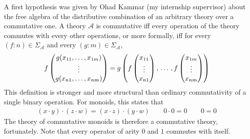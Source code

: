 

A first hypothesis was given by Ohad Kammar (my internship supervisor) about the free algebra of the distributive combination of an arbitrary theory over a commutative one. A theory $\mathcal A$ is commutative iff every operation of the theory commutes with every other operations, or more formally, iff for every $(f : n) \in \Sigma_\mathcal{A}$ and every $(g : m) \in \Sigma_\mathcal{A}$,
\begin{equation}
f \begin{pmatrix}
  g(x_{11}, \dots, x_{1m})\\
  \vdots\\
  g(x_{n1}, \dots, x_{nm})
\end{pmatrix} = g \left(
  f \begin{pmatrix}
    x_{11}\\
    \vdots\\
    x_{n1}
  \end{pmatrix},\, \dots\,, f \begin{pmatrix}
    x_{1m}\\
    \vdots\\
    x_{nm}
  \end{pmatrix}
\right)
  \label{eq:commutativity_theory}
\end{equation}
This definition is stronger and more structural than ordinary commutativity of a single binary operation. For monoids, this states that \begin{gather*}
  (x \cdot y) \cdot (z \cdot w) = (x \cdot z) \cdot (y \cdot w) \qquad 0 \cdot 0 = 0 \qquad 0 = 0
\end{gather*} The theory of commutative monoids is therefore a commutative theory, fortunately. Note that every operator of arity $0$ and $1$ commutes with itself.


